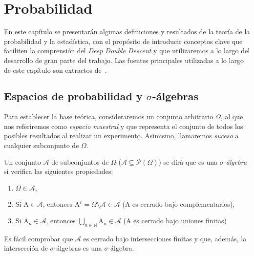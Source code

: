 
\chapter{Probabilidad}\label{ch:capitulo-teoria-de-la-probabilidad}

En este capítulo se presentarán algunas definiciones y resultados de la teoría de la probabilidad y la estadística, con el propósito de introducir conceptos clave que faciliten la comprensión del \textit{Deep Double Descent} y que utilizaremos a lo largo del desarrollo de gran parte del trabajo. Las fuentes principales utilizadas a lo largo de este capítulo son extractos de~\cite{Dembo2014, Knill2009}.

\section{Espacios de probabilidad y $\sigma$-álgebras}

Para establecer la base teórica, consideraremos un conjunto arbitrario $\Omega$, al que nos referiremos como \emph{espacio muestral} y que representa el conjunto de todos los posibles resultados al realizar un experimento. Asimismo, llamaremos \emph{suceso} a cualquier subconjunto de $\Omega$.

\begin{definicion}\label{def:sigma-algebra}
    Un conjunto $\mathcal{A}$ de subconjuntos de $\Omega$ ($\mathcal{A} \subseteq \mathcal{P}(\Omega)$) se dirá que es una \emph{$\sigma$-álgebra} si verifica las siguientes propiedades:

    \begin{enumerate}
        \item $\Omega \in \mathcal{A}$,
        \item Si $\mathrm{A} \in \mathcal{A}$, entonces $\mathrm{A}^c = \Omega \setminus \mathcal{A} \in \mathcal{A}$ ($\mathrm{A}$ es cerrado bajo complementarios),
        \item Si $\mathrm{A}_{n} \in \mathcal{A}$, entonces $\bigcup_{n \in \mathbb{N}} \mathrm{A}_{n} \in \mathcal{A}$ (A es cerrado bajo uniones finitas)
    \end{enumerate}
\end{definicion}

Es fácil comprobar que $\mathcal{A}$ es cerrado bajo intersecciones finitas y que, además, la intersección de $\sigma$-álgebras es una $\sigma$-álgebra.


